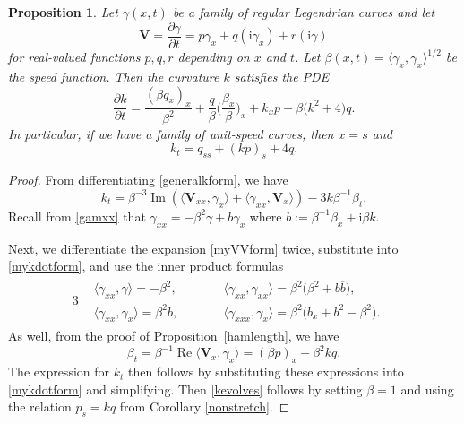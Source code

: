 \documentclass[10pt,a4paper]{amsart}
\newcommand\kk{k} %
\newcommand\speed{\beta} %
\def\ri{\mathrm{i}}
\newcommand\VV{\mathbf V}
\def\gam{\gamma} %
\def\di{\partial}
\renewcommand\Re{\operatorname{Re}}
\renewcommand\Im{\operatorname{Im}}
\numberwithin{equation}{section}
\newtheorem{Proposition}[Theorem]{Proposition}
 { \theoremstyle{definition}
\newtheorem{Definition}[Theorem]{Definition}
\newtheorem{Note}[Theorem]{Note}
\newtheorem{Example}[Theorem]{Example}
\newtheorem{Remark}[Theorem]{Remark} }
\begin{document}
\begin{Proposition}\label{kdeforms}
Let $\gam(x,t)$ be a family of regular Legendrian curves and let
\begin{equation}\label{myVVform}
\VV = \dfrac{\di \gam}{\di t} = p\gam_x + q (\ri\gam_x) + r (\ri \gam)
\end{equation}
for real-valued functions $p,q,r$ depending on $x$ and $t$. Let $\speed(x,t) = \langle \gam_x, \gam_x \rangle^{1/2}$ be the speed function.
Then the curvature $\kk$ satisfies the PDE
\begin{equation}\label{kevolvegen}
\dfrac{\di \kk}{\di t} = \dfrac{(\speed q_x)_x}{\speed^2}
+ \dfrac{q}{\speed}\biggl( \dfrac{\speed_x}{\speed}\biggr)_x
+ \kk_x p + \speed \bigl(\kk^2 + 4\bigr) q.
\end{equation}
In particular, if we have a family of unit-speed curves, then $x=s$ and
\begin{equation}\label{kevolves}
\kk_t = q_{ss} + (\kk p)_s + 4q.
\end{equation}
\end{Proposition}
\begin{proof}
From differentiating \eqref{generalkform}, we have
\begin{equation}\label{mykdotform}
\kk_t = \speed^{-3} \Im\left( \langle \VV_{xx}, \gam_x\rangle + \langle \gam_{xx}, \VV_x\rangle\right)
- 3\kk\speed^{-1} \speed_t.
\end{equation}
Recall from \eqref{gamxx} that $\gam_{xx} = - \speed^2 \gam + b \gam_x$ where $b:= \speed^{-1} \speed_x + \ri \speed \kk$.

Next, we differentiate the expansion \eqref{myVVform} twice, substitute into \eqref{mykdotform}, and use the
inner product formulas
\begin{alignat*}{3}
\begin{aligned}
&\langle \gam_{xx},\gam\rangle= -\speed^2, && \langle \gam_{xx}, \gam_{xx}\rangle= \speed^2 \bigl(\speed^2 + b \overline{b}\bigr),&\\
&\langle \gam_{xx}, \gam_x\rangle= \speed^2 b, \qquad && \langle \gam_{xxx}, \gam_x \rangle= \speed^2 \bigl(b_x + b^2 - \speed^2\bigr).&
\end{aligned}
\end{alignat*}
As well, from the proof of Proposition~\ref{hamlength}, we have
\begin{equation}\label{betadotsecond}
\speed_t = \speed^{-1}\Re \langle \VV_x, \gam_x\rangle = (\speed p)_x - \speed^2 k q.
\end{equation}
The expression for $\kk_t$ then follows by substituting these expressions into \eqref{mykdotform} and simplifying. Then \eqref{kevolves} follows by setting $\speed=1$ and using the relation $p_s = \kk q$ from Corollary
\ref{nonstretch}.
\end{proof}
\end{document}
